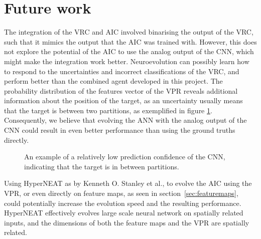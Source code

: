 \section{Future work}
\label{sec:futurework}
The integration of the VRC and AIC involved binarising the output of the VRC, such that it mimics the output that the AIC was trained with. However, this does not explore the potential of the AIC to use the analog output of the CNN, which might make the integration work better. Neuroevolution can possibly learn how to respond to the uncertainties and incorrect classifications of the VRC, and perform better than the combined agent developed in this project. The probability distribution of the features vector of the VPR reveals additional information about the position of the target, as an uncertainty usually means that the target is between two partitions, as exemplified in figure \ref{fig:uncertain}. Consequently, we believe that evolving the ANN with the analog output of the CNN could result in even better performance than using the ground truths directly.

\begin{figure}[H]
	\centering
	\begin{scriptsize}
		\sffamily
		
	\end{scriptsize}
	\caption[An example of uncertain classification]{An example of a relatively low prediction confidence of the CNN, indicating that the target is in between partitions.}
	\label{fig:uncertain}
\end{figure}
\noindent
Using HyperNEAT as by Kenneth O. Stanley et al.\cite{DBLP:journals/alife/StanleyDG09}, to evolve the AIC using the VPR, or even directly on feature maps, as seen in section~\ref{sec:featuremaps}, could potentially increase the evolution speed and the resulting performance. HyperNEAT effectively evolves large scale neural network on spatially related inputs, and the dimensions of both the feature maps and the VPR are spatially related.